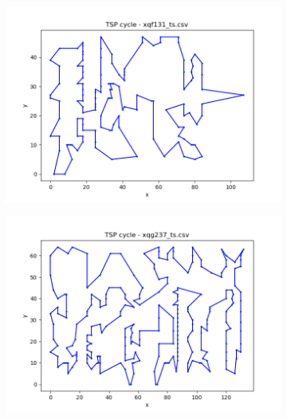\documentclass[12pt]{article}
\begin{document}
        \begin{figure}[htpb]
        \centering
            \begin{subfigure}[b]{0.475\textwidth}
                \includegraphics[width=\linewidth]{img/xqf131_ts.png}
            \end{subfigure}
            \hfill
            \begin{subfigure}[b]{0.475\textwidth}
                \includegraphics[width=\linewidth]{img/xqg237_ts.png}
            \end{subfigure}
        \end{figure}
\end{document}
